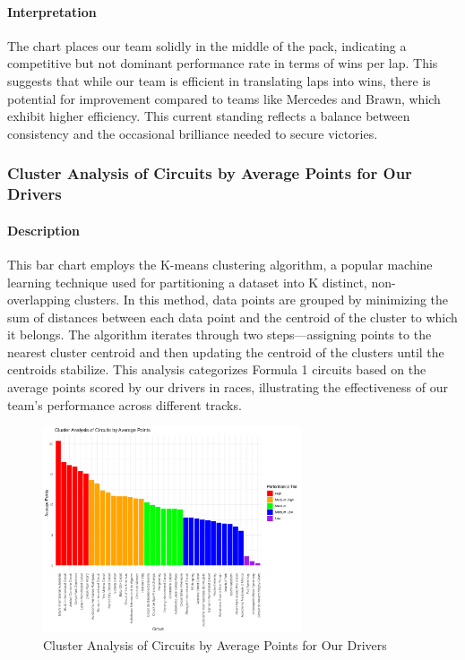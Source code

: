 \documentclass{article}
\begin{document}
\paragraph{Interpretation}
The chart places our team solidly in the middle of the pack, indicating a competitive but not dominant performance rate in terms of wins per lap. This suggests that while our team is efficient in translating laps into wins, there is potential for improvement compared to teams like Mercedes and Brawn, which exhibit higher efficiency. This current standing reflects a balance between consistency and the occasional brilliance needed to secure victories.


\subsubsection{Cluster Analysis of Circuits by Average Points for Our Drivers}

\paragraph{Description}
This bar chart employs the K-means clustering algorithm, a popular machine learning technique used for partitioning a dataset into K distinct, non-overlapping clusters. In this method, data points are grouped by minimizing the sum of distances between each data point and the centroid of the cluster to which it belongs. The algorithm iterates through two steps—assigning points to the nearest cluster centroid and then updating the centroid of the clusters until the centroids stabilize. This analysis categorizes Formula 1 circuits based on the average points scored by our drivers in races, illustrating the effectiveness of our team's performance across different tracks.

\begin{figure}[H]
    \centering
    \includegraphics[width=0.68\textwidth]{images/querie/cluster_average_points_per_circuit.png}
    \caption{Cluster Analysis of Circuits by Average Points for Our Drivers}
\end{figure}
\end{document}
